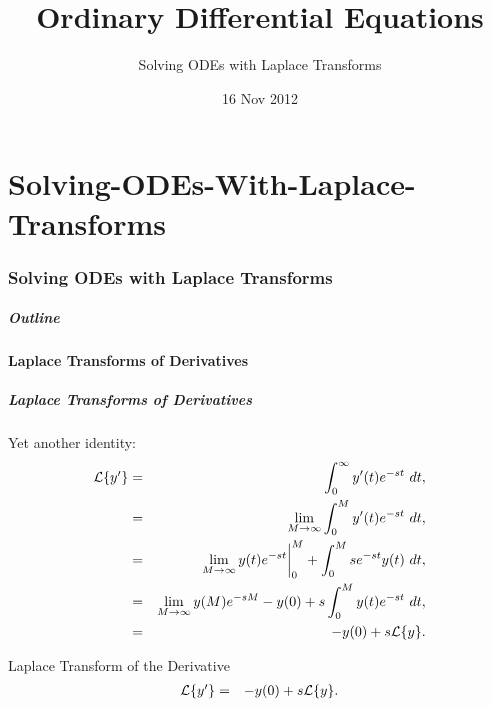 \part{Solving-ODEs-With-Laplace-Transforms}
\section{Solving ODEs with Laplace Transforms}

\title{Ordinary Differential Equations}
\subtitle{Solving ODEs with Laplace Transforms}
\date{16 Nov 2012}

\begin{frame}
  \titlepage
\end{frame}

\begin{frame}
  \frametitle{Outline}
\end{frame}


\subsection{Laplace Transforms of Derivatives}


\begin{frame}
  \frametitle{Laplace Transforms of Derivatives}

  Yet another identity:
  \begin{eqnarray*}
    \laplace{y'} & = & \int^\infty_0 y'(t) e^{-st} ~ dt, \\
    & = & \lim_{M\rightarrow\infty} \int^M_0 y'(t) e^{-st} ~ dt, \\
    & = & \lim_{M\rightarrow\infty} y(t)e^{-st} \bigg|^M_0 + \int^M_0 s e^{-st} y(t)~dt, \\
    & = & \lim_{M\rightarrow\infty} y(M)e^{-sM} - y(0) + s \int^M_0 y(t) e^{-st} ~dt, \\
    & = & -y(0) + s \laplace{y}.
  \end{eqnarray*}

\end{frame}

\begin{frame}
  \begin{block}{Laplace Transform of the Derivative}
    \begin{eqnarray*}
      \laplace{y'} & = & -y(0) + s \laplace{y}.
    \end{eqnarray*}
  \end{block}
\end{frame}

